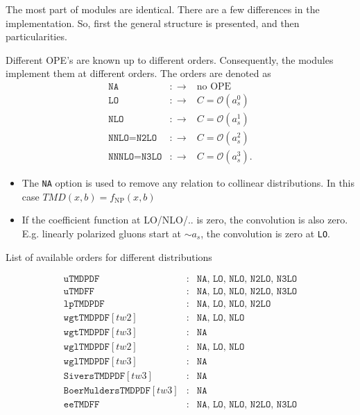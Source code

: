 \documentclass[prd,nofootinbib,eqsecnum,final]{revtex4}
\renewcommand{\(}{\left(}
\renewcommand{\)}{\right)}
\renewcommand{\[}{\left[}
\renewcommand{\]}{\right]}
\begin{document}
The most part of modules are identical. There are a few differences in the implementation. So, first the general structure is presented, and then particularities.

Different OPE's are known up to different orders. Consequently, the modules implement them at different orders. The orders are denoted as
\begin{eqnarray*}
\texttt{NA}&:\to & \text{no OPE}
\\
\texttt{LO}&:\to & C=\mathcal{O}(a_s^0)
\\
\texttt{NLO}&:\to & C=\mathcal{O}(a_s^1)
\\
\texttt{NNLO}=\texttt{N2LO}&:\to & C=\mathcal{O}(a_s^2)
\\
\texttt{NNNLO}=\texttt{N3LO}&:\to & C=\mathcal{O}(a_s^3).
\end{eqnarray*}
\begin{itemize}
\item The \texttt{NA} option is used to remove any relation to collinear distributions. In this case $TMD(x,b)=f_{\text{NP}}(x,b)$
\item If the coefficient function at LO/NLO/.. is zero, the convolution is also zero. E.g. linearly polarized gluons start at $\sim a_s$, the convolution is zero at \texttt{LO}. 
\end{itemize}
\begin{center}
List of available orders for different distributions
\end{center}
\begin{eqnarray*}
\texttt{uTMDPDF}&:& \texttt{NA, LO, NLO, N2LO, N3LO}
\\
\texttt{uTMDFF}&:& \texttt{NA, LO, NLO, N2LO, N3LO}
\\
\texttt{lpTMDPDF}&:& \texttt{NA, LO, NLO, N2LO}
\\
\texttt{wgtTMDPDF}[tw2]&:& \texttt{NA, LO, NLO}
\\
\texttt{wgtTMDPDF}[tw3]&:& \texttt{NA}
\\
\texttt{wglTMDPDF}[tw2]&:& \texttt{NA, LO, NLO}
\\
\texttt{wglTMDPDF}[tw3]&:& \texttt{NA}
\\
\texttt{SiversTMDPDF}[tw3]&:& \texttt{NA}
\\
\texttt{BoerMuldersTMDPDF}[tw3]&:& \texttt{NA}
\\
\texttt{eeTMDFF}&:& \texttt{NA, LO, NLO, N2LO, N3LO}
\end{eqnarray*}
\end{document}
